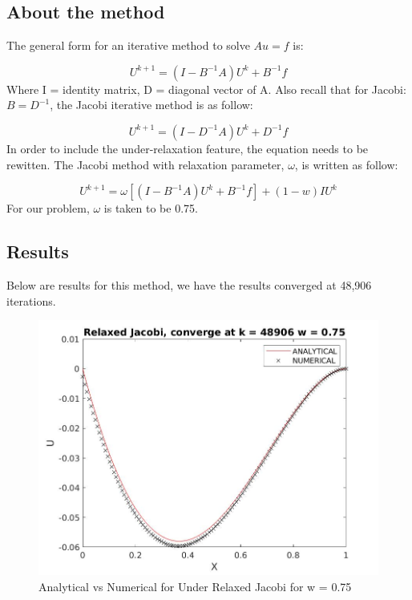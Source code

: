 \documentclass{article}
\begin{document}
\subsection{About the method}
The general form for an iterative method to solve $Au = f$ is: 

\begin{equation}
	U^{k+1} = (I-B^{-1}A)U^k+B^{-1}f
\end{equation}
\noindent
Where I = identity matrix, D = diagonal vector of A. Also recall that for Jacobi: $B = D^{-1}$, the Jacobi iterative method is as follow: 

\begin{equation}
	U^{k+1} = (I-D^{-1}A)U^k+D^{-1}f
\end{equation}
\noindent
In order to include the under-relaxation feature, the equation needs to be rewitten. The Jacobi method with relaxation parameter, $\omega$, is written as follow:

\begin{equation}
	U^{k+1} = \omega[(I-B^{-1}A)U^k+B^{-1}f] + (1-w)IU^k
\end{equation} 
\noindent
For our problem, $\omega$ is taken to be 0.75. 

\subsection{Results}




Below are results for this method, we have the results converged at 48,906 iterations. 

\begin{figure}[H]
	\includegraphics[width=\linewidth]{jacobi75.jpg}	
	
	\caption{Analytical vs Numerical for Under Relaxed Jacobi for w = 0.75}
\end{figure}
\end{document}
